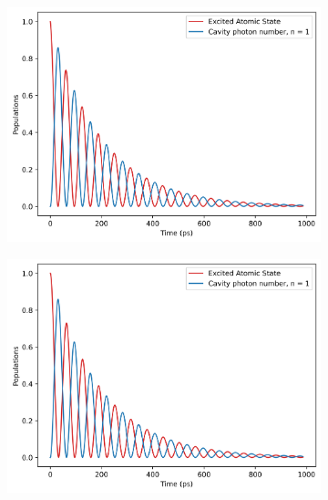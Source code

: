 \documentclass[12pt]{article}
\begin{document}
\begin{figure}[H]
    \centering
    \begin{subfigure}{0.45\textwidth} 
        \centering
        \includegraphics[width=\linewidth]{Research Project/Code/results/JCM/OQS_Pop_Spont.png}
        \caption{}
        \label{fig:JCM_OQS_Pop_Spont}
    \end{subfigure}
    \hfill
    \begin{subfigure}{0.45\textwidth}
        \centering
        \includegraphics[width=\linewidth]{Research Project/Code/results/JCM/OQS_Pop_Therm.png}
        \caption{}
         \label{fig:JCM_OQS_Pop_Therm}
    \end{subfigure}
    

\end{figure}
\end{document}
